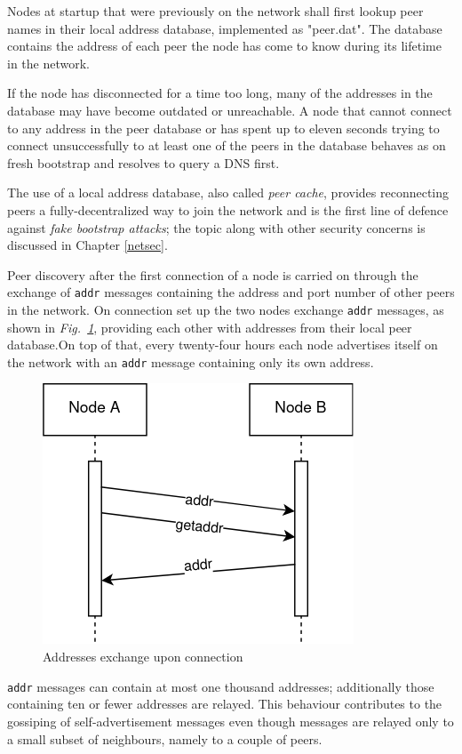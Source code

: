 \documentclass[12pt, letterpaper, twoside]{article}
\begin{document}
Nodes at startup that were previously on the network shall first lookup peer names in their local address database, implemented as "peer.dat". The database contains the address of each peer the node has come to know during its lifetime in the network.

If the node has disconnected for a time too long, many of the addresses in the database may have become outdated or unreachable. A node that cannot connect to any address in the peer database or has spent up to eleven seconds trying to connect unsuccessfully to at least one of the peers in the database behaves as on fresh bootstrap and resolves to query a DNS first.

The use of a local address database, also called \emph{peer cache}, provides reconnecting peers a fully-decentralized way to join the network and is the first line of defence against \emph{fake bootstrap attacks}; the topic along with other security concerns is discussed in Chapter \ref{netsec}.

Peer discovery after the first connection of a node is carried on through the exchange of \texttt{addr} messages containing the address and port number of other peers in the network. On connection set up the two nodes exchange \texttt{addr} messages, as shown in \emph{Fig.~\ref{fig:addr}}, providing each other with addresses from their local peer database.On top of that, every twenty-four hours each node advertises itself on the network with an \texttt{addr} message containing only its own address.

\begin{figure}[h]
	\includegraphics[width=.45\textwidth]{pict/BTCaddr.png}
	\centering
	\caption{Addresses exchange upon connection}
	\label{fig:addr}
\end{figure}

 \texttt{addr} messages can contain at most one thousand addresses; additionally those containing ten or fewer addresses are relayed. This behaviour contributes to the gossiping of self-advertisement messages even though messages are relayed only to a small subset of neighbours, namely to a couple of peers.
\end{document}

